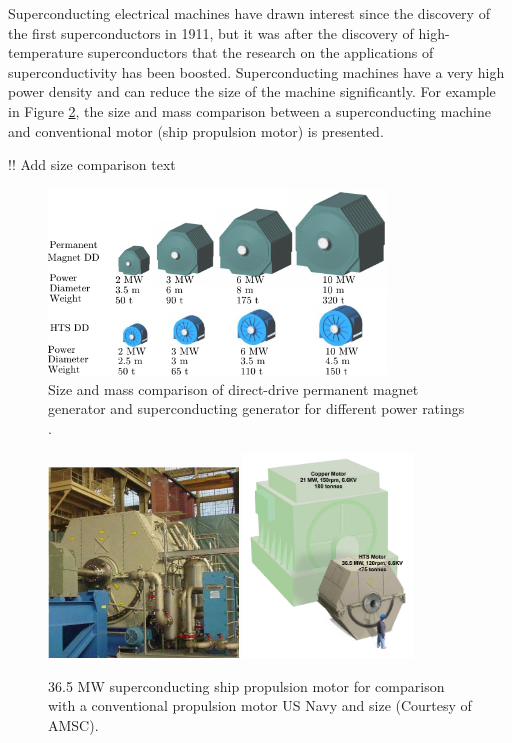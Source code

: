 \documentclass[a4paper, 11pt]{article} %
\begin{document}
Superconducting electrical machines have drawn interest since the discovery of the first superconductors in 1911, but it was after the discovery of high-temperature superconductors that the research on the applications of superconductivity has been boosted. Superconducting machines have a very high power density and can reduce the size of the machine significantly. For example in Figure \ref{amsc_36mw}, the size and mass comparison between a superconducting machine and conventional motor (ship propulsion motor) is presented.


!! Add size comparison text

  \begin{figure}[t]
    \centering
    \includegraphics[width=0.8\textwidth]{amsc_ddpm_hts_comparison}
  	\caption{Size and mass comparison of direct-drive permanent magnet generator and superconducting generator for different power ratings \cite{amsc_presentation}.} 
  	\label{ddpm_hts_compare}
  \end{figure}


  \begin{figure}[t]
    \centering
    \includegraphics[width=0.45\textwidth]{36MW_AMSC}
    \includegraphics[width=0.4\textwidth]{amsc_36mw_compare}
    \caption{36.5 MW superconducting ship propulsion motor for comparison with a conventional propulsion motor US Navy and size  (Courtesy of AMSC).} 
    \label{amsc_36mw}
  \end{figure}
\end{document}

